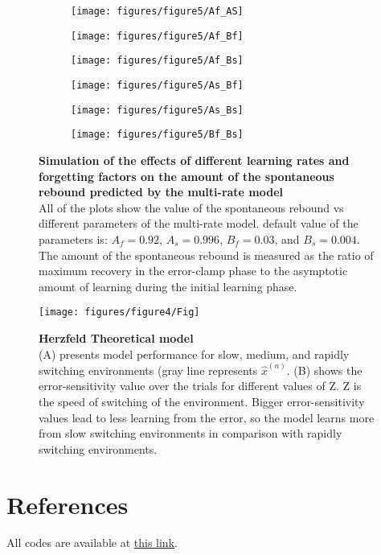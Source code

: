 \documentclass[9pt,twocolumn]{paper-template}
\begin{document}
\begin{figure}[h!]
  \centering
  \begin{subfigure}[b]{0.32\linewidth}
    \texttt{[image: figures/figure5/Af\_AS]}
  \end{subfigure}
  \begin{subfigure}[b]{0.32\linewidth}
    \texttt{[image: figures/figure5/Af\_Bf]}
  \end{subfigure}
   \begin{subfigure}[b]{0.32\linewidth}
    \texttt{[image: figures/figure5/Af\_Bs]}
  \end{subfigure}
    \begin{subfigure}[b]{0.32\linewidth}
    \texttt{[image: figures/figure5/As\_Bf]}
  \end{subfigure}
  \begin{subfigure}[b]{0.32\linewidth}
    \texttt{[image: figures/figure5/As\_Bs]}
  \end{subfigure}
   \begin{subfigure}[b]{0.32\linewidth}
    \texttt{[image: figures/figure5/Bf\_Bs]}
  \end{subfigure}
  \caption{\textbf{Simulation of the effects of different learning rates and forgetting factors on the amount of the spontaneous rebound predicted by the multi-rate model}\\
 All of the plots show the value of the spontaneous rebound vs different parameters of the multi-rate model. default value of the parameters is: $A_f=0.92$, $A_s=0.996$, $B_f=0.03$, and $B_s=0.004$. The amount of the spontaneous rebound is measured as the ratio of maximum recovery in the error-clamp phase to the asymptotic amount of learning during the initial learning phase. 
}
  \label{fig:mutli_rate_params}
\end{figure}



\begin{figure}[h!]
  \centering
    \texttt{[image: figures/figure4/Fig]}
  \caption{\textbf{Herzfeld Theoretical model}\\
  {(A)} presents model performance for slow, medium, and rapidly switching environments (gray line represents $\hat{x}^{(n)}$. {(B)} shows the error-sensitivity value over the trials for different values of Z. Z is the speed of switching of the environment. Bigger error-sensitivity values lead to less learning from the error, so the model learns more from slow switching environments in comparison with rapidly switching environments.
}
  \label{fig:herzfeld}
\end{figure}







\newpage



\section*{References}


\bigskip
\begin{center}
All codes are available at \href{https://github.com/MohammadAminAlamalhoda/Motor-Learning}{this link}.
\end{center}
\end{document}
